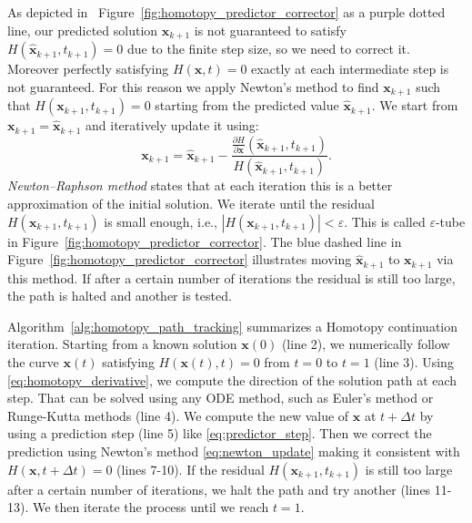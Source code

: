 As depicted in~ Figure~\ref{fig:homotopy_predictor_corrector} as a purple dotted line, our predicted solution \(\hat{\mathbf{x}}_{k+1}\) is not guaranteed to satisfy \(H(\hat{\mathbf{x}}_{k+1}, t_{k+1})=0\) due to the finite step size, so we need to correct it. Moreover perfectly satisfying \(H(\mathbf{x},t)=0\) exactly at each intermediate step is not guaranteed.
For this reason we apply Newton's method to find \(\mathbf{x}_{k+1}\) such that \(H(\mathbf{x}_{k+1}, t_{k+1})=0\) starting from the predicted value \(\hat{\mathbf{x}}_{k+1}\). We start from $\mathbf{x}_{k+1} = \hat{\mathbf{x}}_{k+1}$ and iteratively update it using:
\[
\mathbf{x}_{k+1} = \hat{\mathbf{x}}_{k+1} - \frac{\frac{\partial H}{\partial \mathbf{x}}(\hat{\mathbf{x}}_{k+1}, t_{k+1})}{H(\hat{\mathbf{x}}_{k+1}, t_{k+1})}.
\label{eq:newton_update}
\]
\emph{Newton–Raphson method} states that at each iteration this is a better approximation of the initial solution. We iterate until the residual \(H(\mathbf{x}_{k+1}, t_{k+1})\) is small enough, i.e., \(|H(\mathbf{x}_{k+1}, t_{k+1})| < \varepsilon \). This is called \(\varepsilon\)-tube in Figure~\ref{fig:homotopy_predictor_corrector}.
The blue dashed line in Figure~\ref{fig:homotopy_predictor_corrector} illustrates moving $\hat{\mathbf{x}}_{k+1}$ to $\mathbf{x}_{k+1}$ via this method.
If after a certain number of iterations the residual is still too large, the path is halted and another is tested.

\vspace{\baselineskip}

Algorithm~\ref{alg:homotopy_path_tracking} summarizes a Homotopy continuation iteration.
Starting from a known solution \(\mathbf{x}(0)\) (line 2), we numerically follow the curve \(\mathbf{x}(t)\) satisfying \(H(\mathbf{x}(t), t)=0\) from $t=0$ to $t=1$ (line 3).
Using \ref{eq:homotopy_derivative}, we compute the direction of the solution path at each step. That can be solved using any ODE method, such as Euler's method or Runge-Kutta methods (line 4).
We compute the new value of \(\mathbf{x}\) at \(t+\Delta t\) by using a prediction step (line 5) like \ref{eq:predictor_step}.
Then we correct the prediction using Newton’s method \ref{eq:newton_update} making it consistent with \(H(\mathbf{x}, t+\Delta t)=0\) (lines 7-10).
If the residual \(H(\mathbf{x}_{k+1}, t_{k+1})\) is still too large after a certain number of iterations, we halt the path and try another (lines 11-13).
We then iterate the process until we reach $t=1$.

